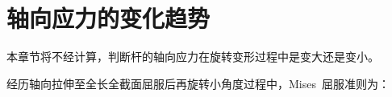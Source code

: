 \chapter{轴向应力的变化趋势}
\setlength{\footskip}{15.61334pt}
\label{cha:trend}
本章节将不经计算，判断杆的轴向应力在旋转变形过程中是变大还是变小。

经历轴向拉伸至全长全截面屈服后再旋转小角度过程中，Mises~屈服准则为：